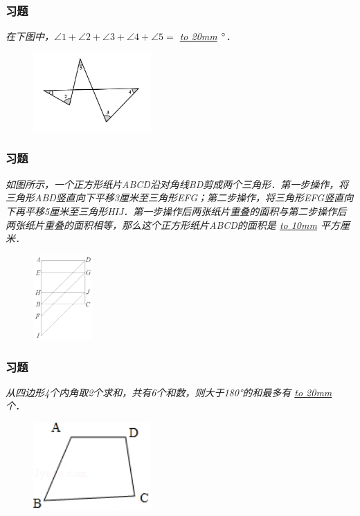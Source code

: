 \begin{frame}
    \frametitle{习题\theframecounter}
    \vspace*{-1cm}
    \textit{在下图中，$\angle 1 + \angle 2 + \angle 3 + \angle 4 + \angle 5=$ \underline{\hbox to 20mm{}} $\degree$．} 
    \begin{figure}[H] 
        \centering
        \includegraphics[width=0.4\textwidth]{./pics/Chapter_3/9.png}
    \end{figure}
\end{frame}

\begin{frame}
    \frametitle{习题\theframecounter}
    \textit{如图所示，一个正方形纸片ABCD沿对角线BD剪成两个三角形．第一步操作，将三角形ABD竖直向下平移3厘米至三角形EFG；第二步操作，将三角形EFG竖直向下再平移5厘米至三角形HIJ．第一步操作后两张纸片重叠的面积与第二步操作后两张纸片重叠的面积相等，那么这个正方形纸片ABCD的面积是 \underline{\hbox to 10mm{}} 平方厘米．} 
    \begin{figure}[H] 
        \centering
        \includegraphics[width=0.2\textwidth]{./pics/Chapter_3/10.png}
    \end{figure}
\end{frame}

\begin{frame}
    \frametitle{习题\theframecounter}
    \vspace*{-1cm}
    \textit{从四边形4个内角取2个求和，共有6个和数，则大于180°的和最多有 \underline{\hbox to 20mm{}} 个．} 
    \begin{figure}[H] 
        \centering
        \includegraphics[width=0.4\textwidth]{./pics/Chapter_3/11.png}
    \end{figure}
\end{frame}

